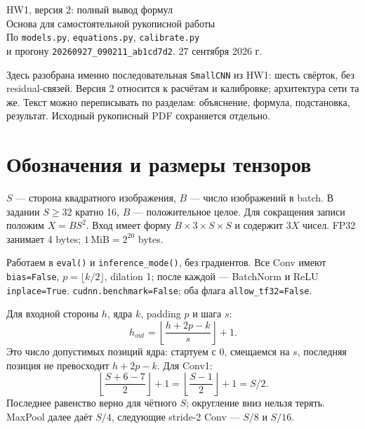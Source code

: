\documentclass[11pt,a4paper]{article}
\begin{document}
\begin{center}
{\LARGE HW1, версия 2: полный вывод формул}\\[5pt]
{\large Основа для самостоятельной рукописной работы}\\[3pt]
\small По \texttt{models.py}, \texttt{equations.py}, \texttt{calibrate.py}\\
и прогону \texttt{20260927\_090211\_ab1cd7d2}. 27 сентября 2026 г.
\end{center}

Здесь разобрана именно последовательная \texttt{SmallCNN} из HW1: шесть
свёрток, без residual-связей. Версия 2 относится к расчётам и калибровке;
архитектура сети та же. Текст можно переписывать по разделам: объяснение,
формула, подстановка, результат. Исходный рукописный PDF сохраняется отдельно.

\section{Обозначения и размеры тензоров}
$S$ --- сторона квадратного изображения, $B$ --- число изображений в batch.
В задании $S\ge32$ кратно 16, $B$ --- положительное целое. Для сокращения
записи положим $X=BS^2$. Вход имеет форму $B\times3\times S\times S$ и
содержит $3X$ чисел. FP32 занимает 4 bytes; $1\,\mathrm{MiB}=2^{20}$ bytes.

Работаем в \texttt{eval()} и \texttt{inference\_mode()}, без градиентов.
Все Conv имеют \texttt{bias=False}, $p=\lfloor k/2\rfloor$, dilation 1;
после каждой --- BatchNorm и ReLU \texttt{inplace=True}.
\texttt{cudnn.benchmark=False}; оба флага \texttt{allow\_tf32=False}.

Для входной стороны $h$, ядра $k$, padding $p$ и шага $s$:
\[
 h_{out}=\left\lfloor\frac{h+2p-k}{s}\right\rfloor+1.
\]
Это число допустимых позиций ядра: стартуем с 0, смещаемся на $s$,
последняя позиция не превосходит $h+2p-k$. Для Conv1:
\[
\left\lfloor\frac{S+6-7}{2}\right\rfloor+1
=\left\lfloor\frac{S-1}{2}\right\rfloor+1=S/2.
\]
Последнее равенство верно для чётного $S$; округление вниз нельзя терять.
MaxPool далее даёт $S/4$, следующие stride-2 Conv --- $S/8$ и $S/16$.
\end{document}
